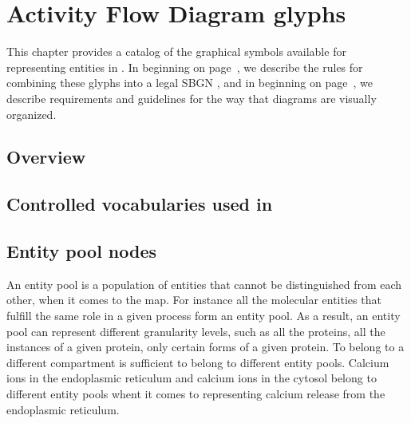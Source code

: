 \chapter{Activity Flow Diagram glyphs}


This chapter provides a catalog of the graphical symbols available for representing entities in \AFs. In  beginning on page~\pageref{chp:grammar}, we describe the rules for combining these glyphs into a legal SBGN \AF, and in  beginning on page~\pageref{chp:layout}, we describe requirements and guidelines for the way that diagrams are visually organized.

\section{Overview}



\section{Controlled vocabularies used in \SBGNAFLone}\label{sec:CVs}

%


\section{Entity pool nodes}\label{sec:EPNs}

An entity pool is a population of entities that cannot be distinguished from each other, when it comes to the \SBGNPDLone map. For instance all the molecular  entities that fulfill the same role in a given process form an entity pool. As a result, an entity pool can represent different granularity levels, such as all the proteins, all the instances of a given protein, only certain forms of a given protein. To belong to a different compartment is sufficient to belong to different entity pools. Calcium ions in the endoplasmic reticulum and calcium ions in the cytosol belong to different entity pools whent it comes to representing calcium release from the endoplasmic reticulum.

